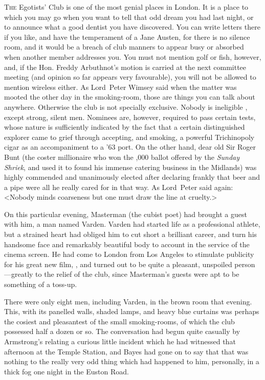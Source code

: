 
\lettrine{T}{he} Egotists' Club is one of the most genial places in London. It is a place to which you may go when you want to tell that odd dream you had last night, or to announce what a good dentist you have discovered. You can write letters there if you like, and have the temperament of a Jane Austen, for there is no silence room, and it would be a breach of club manners to appear busy or absorbed when another member addresses you. You must not mention golf or fish, however, and, if the Hon. Freddy Arbuthnot's motion is carried at the next committee meeting (and opinion so far appears very favourable), you will not be allowed to mention wireless either. As Lord~Peter Wimsey said when the matter was mooted the other day in the smoking-room, those are things you can talk about anywhere. Otherwise the club is not specially exclusive. Nobody is ineligible , except strong, silent men. Nominees are, however, required to pass certain tests, whose nature is sufficiently indicated by the fact that a certain distinguished explorer came to grief through accepting, and smoking, a powerful Trichinopoly cigar as an accompaniment to a '63 port. On the other hand, dear old Sir Roger Bunt (the coster millionaire who won the ,000 ballot offered by the \textit{Sunday Shriek}, and used it to found his immense catering business in the Midlands) was highly commended and unanimously elected after declaring frankly that beer and a pipe were all he really cared for in that way. As Lord~Peter said again: <Nobody minds coarseness but one must draw the line at cruelty.>

On this particular evening, Masterman (the cubist poet) had brought a guest with him, a man named Varden. Varden had started life as a professional athlete, but a strained heart had obliged him to cut short a brilliant career, and turn his handsome face and remarkably beautiful body to account in the service of the cinema screen. He had come to London from Los Angeles to stimulate publicity for his great new film, , and turned out to be quite a pleasant, unspoiled person—greatly to the relief of the club, since Masterman's guests were apt to be something of a toss-up.

There were only eight men, including Varden, in the brown room that evening. This, with its panelled walls, shaded lamps, and heavy blue curtains was perhaps the cosiest and pleasantest of the small smoking-rooms, of which the club possessed half a dozen or so. The conversation had begun quite casually by Armstrong's relating a curious little incident which he had witnessed that afternoon at the Temple Station, and Bayes had gone on to say that that was nothing to the really very odd thing which had happened to him, personally, in a thick fog one night in the Euston Road.

